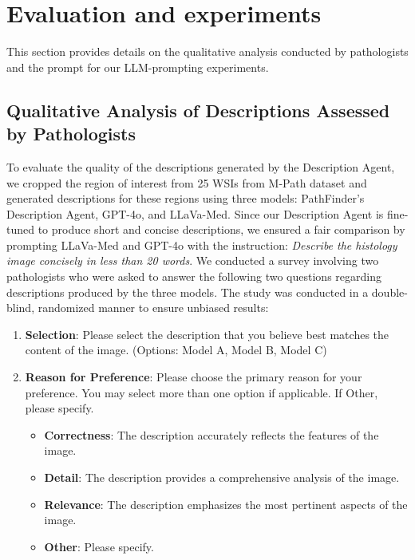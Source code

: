 \section{Evaluation and experiments}

This section provides details on the qualitative analysis conducted by pathologists and the prompt for our LLM-prompting experiments.

\subsection{Qualitative Analysis of Descriptions Assessed by Pathologists}
\label{supp:pathologists-analysis}

To evaluate the quality of the descriptions generated by the Description Agent, we cropped the region of interest from 25 WSIs from M-Path dataset and generated descriptions for these regions using three models: PathFinder's Description Agent, GPT-4o, and LLaVa-Med. Since our Description Agent is fine-tuned to produce short and concise descriptions, we ensured a fair comparison by prompting LLaVa-Med and GPT-4o with the instruction: \textit{Describe the histology image concisely in less than 20 words}. We conducted a survey involving two pathologists who were asked to answer the following two questions regarding descriptions produced by the three models. The study was conducted in a double-blind, randomized manner to ensure unbiased results:

\begin{enumerate}
    \item \textbf{Selection}: Please select the description that you believe best matches the content of the image. (Options: Model A, Model B, Model C)
    \item \textbf{Reason for Preference}: Please choose the primary reason for your preference. You may select more than one option if applicable. If Other, please specify.
    \begin{itemize}
        \item \textbf{Correctness}: The description accurately reflects the features of the image.
        \item \textbf{Detail}: The description provides a comprehensive analysis of the image.
        \item \textbf{Relevance}: The description emphasizes the most pertinent aspects of the image.
        \item \textbf{Other}: Please specify.
    \end{itemize}
\end{enumerate}

